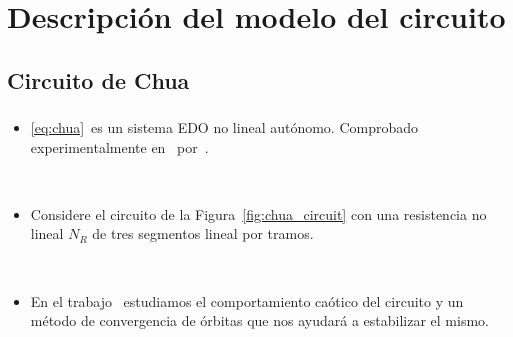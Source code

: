 \section{Descripción del modelo del circuito}

\subsection{Circuito de Chua}

\begin{frame}
	\frametitle{\subsecname}

	\begin{itemize}
		\item

		      \eqref{eq:chua}~es un sistema EDO no lineal autónomo.
		      Comprobado experimentalmente en~\citeyear{Zhong:M84/56}
		      por~.

		      \


		\item

		      Considere el circuito de la Figura~\ref{fig:chua_circuit}
		      con una \alert{resistencia no lineal $N_{R}$} de tres
		      segmentos lineal por tramos.

		      \

		\item

		      En el trabajo~ estudiamos el
		      comportamiento caótico del circuito y un
		      \alert{método de convergencia de órbitas} que nos ayudará
		      a estabilizar el mismo.
	\end{itemize}

	\


\end{frame}
